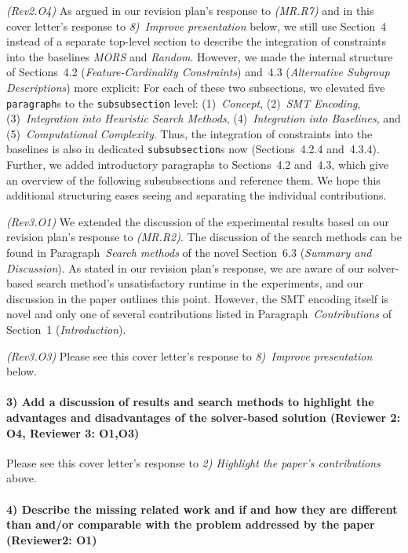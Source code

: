 \documentclass{article}
\begin{document}
\emph{(Rev2.O4)} As argued in our revision plan's response to \emph{(MR.R7)} and in this cover letter's response to \emph{8)~Improve presentation} below, we still use Section~4 instead of a separate top-level section to describe the integration of constraints into the baselines \emph{MORS} and \emph{Random}.
However, we made the internal structure of Sections~4.2 (\emph{Feature-Cardinality Constraints}) and~4.3 (\emph{Alternative Subgroup Descriptions}) more explicit:
For each of these two subsections,  we elevated five \texttt{paragraph}s to the \texttt{subsubsection} level:
(1)~\emph{Concept}, (2)~\emph{SMT Encoding}, (3)~\emph{Integration into Heuristic Search Methods}, (4)~\emph{Integration into Baselines}, and (5)~\emph{Computational Complexity}.
Thus, the integration of constraints into the baselines is also in dedicated \texttt{subsubsection}s now (Sections~4.2.4 and~4.3.4).
Further, we added introductory paragraphs to Sections~4.2 and~4.3, which give an overview of the following subsubsections and reference them.
We hope this additional structuring eases seeing and separating the individual contributions.

\emph{(Rev3.O1)} We extended the discussion of the experimental results based on our revision plan's response to \emph{(MR.R2)}.
The discussion of the search methods can be found in Paragraph~\emph{Search methods} of the novel Section~6.3 (\emph{Summary and Discussion}).
As stated in our revision plan's response, we are aware of our solver-based search method's unsatisfactory runtime in the experiments, and our discussion in the paper outlines this point.
However, the SMT encoding itself is novel and only one of several contributions listed in Paragraph~\emph{Contributions} of Section~1 (\emph{Introduction}).

\emph{(Rev3.O3)} Please see this cover letter's response to \emph{8)~Improve presentation} below.

\paragraph{3) Add a discussion of results and search methods to highlight the advantages and disadvantages of the solver-based solution (Reviewer 2: O4, Reviewer 3: O1,O3)}

Please see this cover letter's response to \emph{2) Highlight the paper’s contributions} above.

\paragraph{4) Describe the missing related work and if and how they are different than and/or comparable with the problem addressed by the paper (Reviewer2: O1)}
\end{document}
